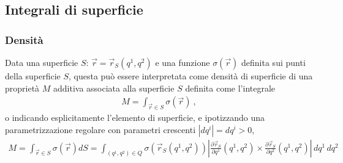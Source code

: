 \documentclass[letterpaper,10pt,italian]{jupyterBook}
\begin{document}
\subsection{Integrali di superficie}
\label{\detokenize{ch/vector-calculus/integrals:integrali-di-superficie}}\label{\detokenize{ch/vector-calculus/integrals:vector-calculus-integrals-surface}}

\subsubsection{Densità}
\label{\detokenize{ch/vector-calculus/integrals:vector-calculus-integrals-surface-density}}\label{\detokenize{ch/vector-calculus/integrals:id1}}
\sphinxAtStartPar
Data una superficie \(S: \, \vec{r} = \vec{r}_S(q^1, q^2)\) e una funzione \(\sigma(\vec{r})\) definita sui punti della superficie \(S\), questa può essere interpretata come densità di superficie di una proprietà \(M\) additiva associata alla superficie \(S\) definita come l’integrale
\begin{equation*}
\begin{split}M = \int_{\vec{r} \in S} \sigma(\vec{r}) \ ,\end{split}
\end{equation*}
\sphinxAtStartPar
o indicando esplicitamente l’elemento di superficie, e ipotizzando una parametrizzazione regolare con parametri crescenti \(|d q^i| = d q^i > 0\),
\begin{equation*}
\begin{split}M = \int_{\vec{r} \in S} \sigma(\vec{r}) d S = \int_{(q^1,q^2) \in Q} \sigma\left( \vec{r}_S(q^1, q^2) \right) \left|\frac{\partial \vec{r}_S}{\partial q^1}(q^1,q^2) \times \frac{\partial \vec{r}_S}{\partial q^2}(q^1,q^2) \right| \, dq^1 \, dq^2\end{split}
\end{equation*}
\end{document}
